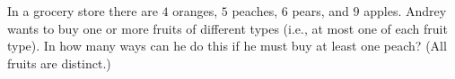 In a grocery store there are $4$ oranges, $5$ peaches, $6$ pears, and $9$ apples. Andrey wants to buy one or more fruits of different types (i.e., at most one of each fruit type). In how many ways can he do this if he must buy at least one peach? (All fruits are distinct.)
